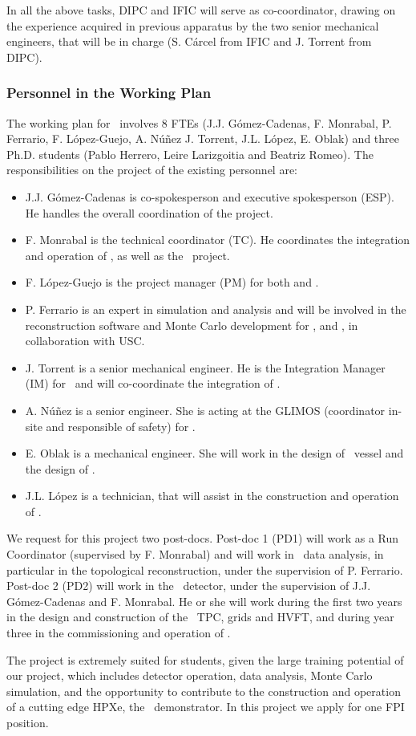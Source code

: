 \indent

In all the above tasks, DIPC and IFIC will serve as co-coordinator, drawing on the experience acquired in previous apparatus by the two senior mechanical engineers, that will be in charge (S. C\'arcel from IFIC and J. Torrent from DIPC). 

\subsubsection*{Personnel in the Working Plan}
The working plan for \sDIPC\ involves 8 FTEs (J.J. G\'omez-Cadenas, F. Monrabal, P. Ferrario, F. L\'opez-Guejo, A. N\'u\~nez J. Torrent, J.L. L\'opez, E. Oblak) and three Ph.D. students (Pablo Herrero, Leire Larizgoitia and Beatriz Romeo). The responsibilities on the project of the existing personnel are:


\begin{itemize}[noitemsep,topsep=0pt,parsep=0pt,partopsep=0pt]
\item J.J. G\'omez-Cadenas is co-spokesperson and executive spokesperson (ESP). He handles the overall coordination of the project. 
\item F. Monrabal is the technical coordinator (TC). He coordinates the integration and operation of \Next, as well as the \HDEMO\ project.
\item  F. L\'opez-Guejo is the project manager (PM) for both \Next and \NHD.
\item P. Ferrario is an expert in simulation and analysis and will be involved in the reconstruction software and Monte Carlo development for \Next, \HDEMO and \NHD, in collaboration with USC. 
\item J. Torrent is a senior mechanical engineer. He is the Integration Manager (IM) for \Next\ and will co-coordinate the integration of \NHD. 
\item A. N\'u\~nez is a senior engineer. She is acting at the GLIMOS (coordinator in-site and responsible of safety) for \Next. 
\item E. Oblak is a  mechanical engineer. She  will work in the design of \NHD\ vessel and the design of \HDEMO.  
\item J.L. L\'opez is a technician, that will assist in the construction and operation of \HDEMO. 
\end{itemize}

We request for this project two post-docs. Post-doc 1 (PD1) will work as a Run Coordinator (supervised by F. Monrabal) and will work in \Next\ data analysis, in particular in the topological reconstruction, under the supervision of P. Ferrario. Post-doc 2 (PD2) will work in the \HDEMO\ detector, under the supervision of J.J. G\'omez-Cadenas and F. Monrabal. He or she will work during the first two years in the design and construction of the
\HDEMO\ TPC, grids and HVFT, and during year three in the commissioning and operation of \NHD. 

The project is extremely suited for students, given the large training potential of our project, which includes detector operation, data analysis, Monte Carlo simulation, and the opportunity to contribute to the construction and operation of a cutting edge HPXe, the \HDEMO\ demonstrator. In this project we apply for one FPI position. 
